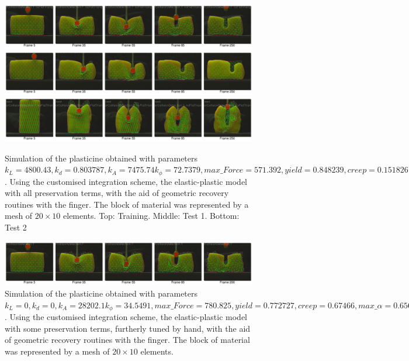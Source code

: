 \documentclass[journal]{IEEEtran}
\begin{document}
\begin{figure}[!t]
\centering
\includegraphics[width=178mm]{arrio12}
\includegraphics[width=178mm]{arrio13}
\includegraphics[width=178mm]{arrio14}
\caption{Simulation of the plasticine obtained with parameters $k_L=4800.43, k_d=0.803787, k_A=7475.74 k_{\phi}=72.7379, max\_Force=571.392, yield=0.848239, creep=0.151826, max\_\alpha=0.126444$.  Using the customised integration scheme, the elastic-plastic model with all preservation terms, with the aid of geometric recovery routines with the finger.  The block of material was represented by a mesh of $20 \times 10$ elements. Top: Training. Middle: Test 1. Bottom: Test 2}\label{fig:simulation_plasticine}
\end{figure}

\begin{figure}[!t]
\centering
\includegraphics[width=178mm]{arrio16}
\caption{Simulation of the plasticine obtained with parameters $k_L=0, k_d=0, k_A=28202.1 k_{\phi}=34.5491, max\_Force=780.825, yield=0.772727, creep=0.67466, max\_\alpha=0.656572$.  Using the customised integration scheme, the elastic-plastic model with some preservation terms, furtherly tuned by hand,  with the aid of geometric recovery routines with the finger.  The block of material was represented by a mesh of $20 \times 10$ elements.}\label{fig:simulation_plasticine_hand}
\end{figure}
\end{document}
